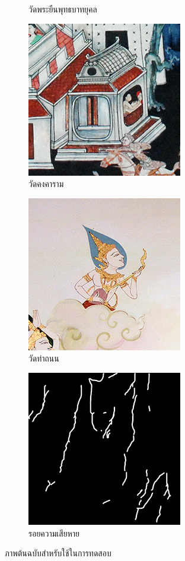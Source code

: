 \begin{figure}[H]
\begin{subfigure}{\ResultSubFigureWidth \linewidth}
        \caption{วัดพระยืนพุทธบาทยุคล}
        \label{image:thaiart_case03_original}			
    \end{subfigure}		
    \begin{subfigure}{\ResultSubFigureWidth \linewidth}
        \centering
        \includegraphics[width=\ResultSubFigurePadding \linewidth]{image/thaiart/case04-original.png}
        \caption{วัดคงคาราม}
        \label{image:thaiart_case04_original}			
    \end{subfigure}
    \begin{subfigure}{\ResultSubFigureWidth \linewidth}
        \centering
        \includegraphics[width=\ResultSubFigurePadding \linewidth]{image/thaiart/case05-original.png}
        \caption{วัดท่าถนน}
        \label{image:thaiart_case05_original}			
    \end{subfigure}
    \begin{subfigure}{\ResultSubFigureWidth \linewidth}
        \centering
        \includegraphics[width=\ResultSubFigurePadding \linewidth]{image/thaiart/inpaint-domain.png}
        \caption{รอยความเสียหาย}
    \end{subfigure}
    \caption{ภาพต้นฉบับสำหรับใช้ในการทดสอบ}
\end{figure}